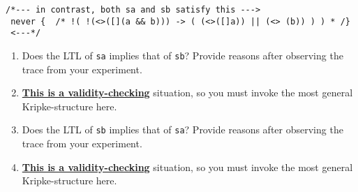\documentclass[11pt]{article}
\begin{document}
\begin{enumerate}
\begin{enumerate}




\begin{verbatim}
/*--- in contrast, both sa and sb satisfy this --->
 never {  /* !( !(<>([](a && b))) -> ( (<>([]a)) || (<> (b)) ) ) * /}
 <---*/
\end{verbatim}

    
    \begin{enumerate}
    \item    Does the LTL of {\tt sa} implies that of {\tt sb}?
      Provide reasons after observing the trace from your experiment.
    \item[] \underline{\bf This is a validity-checking} situation, so
      you must invoke the most general Kripke-structure here.


      
    \item    Does the LTL of {\tt sb} implies that of {\tt sa}?
      Provide reasons after observing the trace from your experiment.
    \item[] \underline{\bf This is a validity-checking} situation, so
      you must invoke the most general Kripke-structure here.
   
    \end{enumerate}
  \end{enumerate}




\begin{minipage}{\minpagw}
\end{minipage}

\clearpage


\end{enumerate}
\end{document}
